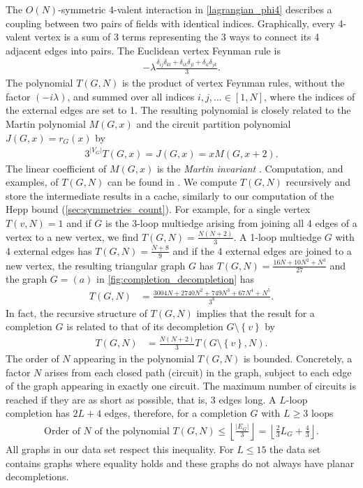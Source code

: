 \documentclass[12pt,a4paper]{article}
\newcommand{\abs}[1]{\lvert #1 \rvert}
\renewcommand{\|}{\rule[-0.4ex]{0.2ex}{1.2em}}
\begin{document}
The $O(N)$-symmetric 4-valent interaction in \cref{lagrangian_phi4} describes a coupling between two  pairs of fields with identical indices. Graphically, every 4-valent vertex is a sum of 3 terms representing the 3 ways to connect its 4 adjacent edges into pairs. The Euclidean vertex Feynman rule is
\begin{align*}
	- \lambda \frac{\delta_{ij}\delta_{kl} + \delta_{ik}\delta_{jl} + \delta_{il}\delta_{jk}}{3}.
\end{align*}
The polynomial $T(G,N)$ is the product of vertex Feynman rules, without the factor $(-i\lambda)$, and summed over all indices $  i,j,\ldots  \in [1,N]$, where the indices of the   external edges are set to 1. The resulting polynomial is closely related to the Martin polynomial $M(G,x)$ and the circuit partition polynomial $J(G,x)=r_G(x)$  \cite{martin_enumerations_1977,ellis-monaghan_new_1998,bollobas_evaluations_2002} by 
\begin{align}\label{circuit_martin}
3^{\abs{V_G}}  T(G,x)  = J(G,x)= xM(G,x+2).
\end{align}
The linear coefficient of $M(G,x)$ is the \emph{Martin invariant} \cite{bouchet_connectivity_1996,panzer_feynman_2023}. 
Computation, and examples, of $T(G,N)$ can be found in \cite{kleinert_critical_2001}.
We compute $T(G,N)$ recursively and store the intermediate results in a cache, similarly to our computation of the Hepp bound (\cref{sec:symmetries_count}).
For example, for a single vertex $T(v,N)=1$ and if $G$ is the 3-loop multiedge arising from joining all 4 edges of a vertex to a new vertex, we find $T(G,N)=\frac{N(N+2)}{3}$. A 1-loop multiedge $G$ with 4 external edges has $T(G,N)=\frac{N+8}{9}$ and if the 4 external edges are joined to a new vertex, the resulting triangular graph $G$ has $T(G,N)=\frac{16N+10N^2+N^3}{27}$ and the graph $G=(a)$ in \cref{fig:completion_decompletion} has 
\begin{align*}
	T\left( G,N \right) &=\frac{  3004 N + 2740 N^2 + 749 N^3 + 67 N^4 + N^5}{3^8}.
\end{align*}
In fact, the recursive structure of $T(G,N)$  implies that the result for a completion $G$ is related to that of its decompletion $G\setminus \left \lbrace v \right \rbrace $ by 
\begin{align}\label{TGN_decompletion}
T(G,N) &= \frac{N(N+2)}{3} T(G\setminus \left \lbrace v \right \rbrace , N ).
\end{align}
The order of $N$ appearing in the polynomial $T(G,N)$ is bounded. Concretely, a factor $N$ arises from each closed path (circuit) in the graph, subject to each edge of the graph appearing in exactly one circuit. The maximum number of circuits is reached if they are as short as possible,  that is, 3 edges long. A $L$-loop completion has $2L+4$ edges, therefore, for a completion $G$ with $L\geq 3$ loops
\begin{align}\label{TGN_bound}
\text{Order of } N \text{ of the polynomial } T(G,N)  \leq  \left \lfloor \frac{\abs{E_G}}{3}\right \rfloor  =\left \lfloor \frac{2}{3}L_G + \frac 4 3\right \rfloor.
\end{align}
All graphs in our data set respect this inequality. For   $L \leq 15$ the data set contains graphs where equality holds and these graphs do not always have planar decompletions. 
\end{document}
